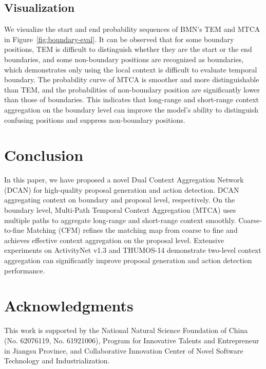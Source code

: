 \documentclass[letterpaper]{article} \usepackage{aaai22}  \usepackage{times}  \usepackage{helvet}  \usepackage{courier}  \usepackage[hyphens]{url}  \usepackage{graphicx} \urlstyle{rm} \def\UrlFont{\rm}  \usepackage{natbib}  \usepackage{caption} \DeclareCaptionStyle{ruled}{labelfont=normalfont,labelsep=colon,strut=off} \frenchspacing  \setlength{\pdfpagewidth}{8.5in}  \setlength{\pdfpageheight}{11in}  \usepackage{algorithm}
\begin{document}
\subsection{Visualization}
We visualize the start and end probability sequences of BMN's TEM and MTCA in Figure~\ref{fig:boundary-eval}. 
It can be observed that for some boundary positions, TEM is difficult to distinguish whether they are the start or the end boundaries, and some non-boundary positions are recognized as boundaries, which demonstrates only using the local context is difficult to evaluate temporal boundary.
The probability curve of MTCA is smoother and more distinguishable than TEM, and the probabilities of non-boundary position are significantly lower than those of boundaries.
This indicates that long-range and short-range context aggregation on the boundary level can improve the model's ability to distinguish confusing positions and suppress non-boundary positions.





\section{Conclusion}
In this paper, we have proposed a novel Dual Context Aggregation Network (DCAN) for high-quality proposal generation and action detection.
DCAN aggregating context on boundary and proposal level, respectively.
On the boundary level, Multi-Path Temporal Context Aggregation (MTCA) uses multiple paths to aggregate long-range and short-range context smoothly.
Coarse-to-fine Matching (CFM) refines the matching map from coarse to fine and achieves effective context aggregation on the proposal level. 
Extensive experiments on ActivityNet v1.3 and THUMOS-14 demonstrate two-level context aggregation can significantly improve proposal generation and action detection performance.



\section{Acknowledgments}


This work is supported by the National Natural Science Foundation of China (No. 62076119, No. 61921006), Program for Innovative Talents and Entrepreneur in Jiangsu Province, and Collaborative Innovation Center of Novel Software Technology and Industrialization. 


\end{document}
